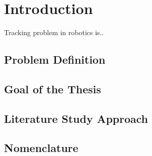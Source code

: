 %
\chapter{Introduction} \label{chap::intro}

Tracking problem in robotics is..

\section{Problem Definition}

\section{Goal of the Thesis}

\section{Literature Study Approach}

\section{Nomenclature}


